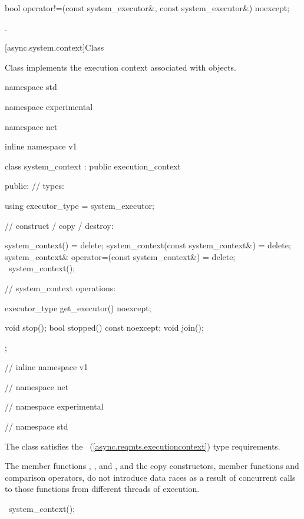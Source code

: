 %
\begin{itemdecl}
bool operator!=(const system_executor&, const system_executor&) noexcept;
\end{itemdecl}

\begin{itemdescr}
\pnum
\returns {}.
\end{itemdescr}




[async.system.context]{Class }

%
\pnum
Class  implements the execution context associated with  objects.

\begin{codeblock}
namespace std {
namespace experimental {
namespace net {
inline namespace v1 {

  class system_context : public execution_context
  {
  public:
    // types:

    using executor_type = system_executor;

    // construct / copy / destroy:

    system_context() = delete;
    system_context(const system_context&) = delete;
    system_context& operator=(const system_context&) = delete;
    ~system_context();

    // system_context operations:

    executor_type get_executor() noexcept;

    void stop();
    bool stopped() const noexcept;
    void join();
  };

} // inline namespace v1
} // namespace net
} // namespace experimental
} // namespace std
\end{codeblock}

\pnum
The class  satisfies the ~(\ref{async.reqmts.executioncontext}) type requirements.

\pnum
The  member functions , , and , and the  copy constructors, member functions and comparison operators, do not introduce data races as a result of concurrent calls to those functions from different threads of execution.

%
\begin{itemdecl}
~system_context();
\end{itemdecl}

